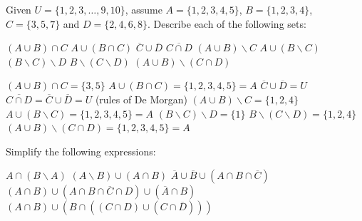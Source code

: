 \begin{Exercise} 
    Given $U=\{1, 2, 3, \ldots, 9, 10\}$, assume $A =\{1, 2, 3, 4, 5\}$, $B =\{1, 2, 3, 4\}$, $C =\{3, 5, 7\}$ and $D =\{2, 4, 6, 8\}$. Describe each of the following sets:
    \begin{multicols}{2}
    	\Question[difficulty = 1] $(A \cup B) \cap C$
    	\Question[difficulty = 1] $A \cup (B \cap C)$
    	\Question[difficulty = 1] $\overline{C} \cup \overline{D}$
    	\Question[difficulty = 1] $\overline{C \cap D}$
    	\Question[difficulty = 1] $(A \cup B)\backslash C $
    	\Question[difficulty = 1] $A \cup (B \backslash C)$
    	\ifanalysis\Question[difficulty = 1]\fi \ifcalculus\Question[difficulty = 2]\fi $(B \backslash C) \backslash D$	
    	\ifanalysis\Question[difficulty = 1]\fi \ifcalculus\Question[difficulty = 2]\fi $B \backslash (C \backslash D)$
    	\Question[difficulty = 2] $(A \cup B)\backslash (C \cap D) $
    	\EndCurrentQuestion
	\end{multicols}
\end{Exercise}

\begin{Answer}\phantom{}
    \begin{multicols}{2}
    
        	\Question $(A \cup B) \cap C = \{3, 5\}$
        	\Question $A \cup (B \cap C) = \{1, 2, 3, 4, 5\} = A$
        	\Question $\overline{C} \cup \overline{D} = U$
        	\Question $\overline{C \cap D} = \overline{C} \cup \overline{D} = U $ \quad (rules of De Morgan)
        	\Question $(A \cup B)\backslash C = \{1, 2, 4\} $
        	\Question $A \cup (B \backslash C) = \{1, 2, 3, 4, 5\} = A$
        	\Question $(B \backslash C) \backslash D = \{1\}$	
        	\Question $B \backslash (C \backslash D) = \{1, 2, 4\}$
            \Question $(A \cup B)\backslash (C \cap D) = \{1, 2, 3, 4, 5\} = A$
        \EndCurrentQuestion
    \end{multicols}
\end{Answer}

\begin{Exercise} Simplify the following expressions:
    \begin{multicols}{2}
    	\Question[difficulty = 1] $A \cap (B \backslash A)$
    	\Question[difficulty = 1] $(A \backslash B) \cup (A \cap B)$
    	\Question[difficulty = 2] $\overline{A} \cup \overline{B} \cup \left( A \cap B \cap \overline{C} \right)$
    	\Question[difficulty = 3] $(A \cap B) \cup \left( A \cap B \cap \overline{C} \cap D \right) \cup \left( \overline{A} \cap B \right)$
    	\Question[difficulty = 3] $(A \cap B) \cup \left(B \cap \left( \left(C\cap D\right)\cup \left(C \cap \overline{D} \right) \right)   \right)$
    	\EndCurrentQuestion
	\end{multicols}
\end{Exercise}

